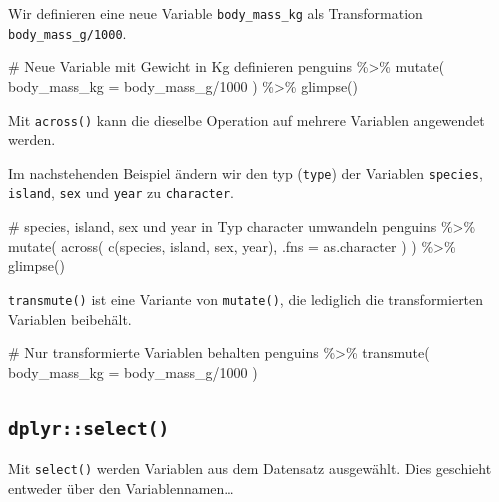 \documentclass[
  a4paper,
  DIV=11,
  oneside]{scrreprt}
\newenvironment{Shaded}{\begin{snugshade}}{\end{snugshade}}
\newcommand{\NormalTok}[1]{\textcolor[rgb]{0.00,0.23,0.31}{#1}}
\begin{document}
Wir definieren eine neue Variable \texttt{body\_mass\_kg} als
Transformation \texttt{body\_mass\_g/1000}.

\begin{Shaded}
\begin{Highlighting}[]
\NormalTok{\# Neue Variable mit Gewicht in Kg definieren}
\NormalTok{penguins \%\textgreater{}\% }
\NormalTok{  mutate(}
\NormalTok{    body\_mass\_kg = body\_mass\_g/1000}
\NormalTok{  ) \%\textgreater{}\%}
\NormalTok{  glimpse()}
\end{Highlighting}
\end{Shaded}

Mit \texttt{across()} kann die dieselbe Operation auf mehrere Variablen
angewendet werden.

Im nachstehenden Beispiel ändern wir den typ (\texttt{type}) der
Variablen \texttt{species}, \texttt{island}, \texttt{sex} und
\texttt{year} zu \texttt{character}.

\begin{Shaded}
\begin{Highlighting}[]
\NormalTok{\# species, island, sex und year in Typ \textquotesingle{}character\textquotesingle{} umwandeln}
\NormalTok{penguins \%\textgreater{}\% }
\NormalTok{  mutate(}
\NormalTok{    across(}
\NormalTok{      c(species, island, sex, year), }
\NormalTok{      .fns = as.character}
\NormalTok{    )}
\NormalTok{  ) \%\textgreater{}\%}
\NormalTok{  glimpse()}
\end{Highlighting}
\end{Shaded}

\texttt{transmute()} ist eine Variante von \texttt{mutate()}, die
lediglich die transformierten Variablen beibehält.

\begin{Shaded}
\begin{Highlighting}[]
\NormalTok{\# Nur transformierte Variablen behalten}
\NormalTok{penguins \%\textgreater{}\% }
\NormalTok{  transmute(}
\NormalTok{    body\_mass\_kg = body\_mass\_g/1000}
\NormalTok{  )}
\end{Highlighting}
\end{Shaded}

\subsection{\texorpdfstring{\texttt{dplyr::select()}}{dplyr::select()}}\label{dplyrselect}

Mit \texttt{select()} werden Variablen aus dem Datensatz ausgewählt.
Dies geschieht entweder über den Variablennamen\ldots{}
\end{document}
